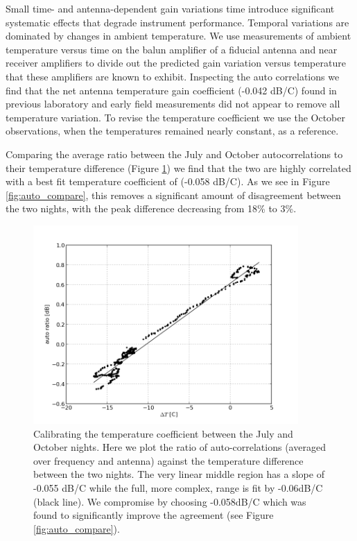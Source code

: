 \documentclass[preprint]{aastex}
\begin{document}
Small time- and antenna-dependent gain variations time introduce significant systematic effects that degrade 
instrument performance. Temporal variations are dominated by changes in ambient temperature. 
We use measurements of ambient temperature versus time on the balun amplifier of a fiducial antenna and near
receiver amplifiers to divide out the predicted gain variation versus temperature that these amplifiers
are known to exhibit.  Inspecting the auto correlations we find that the net antenna temperature gain coefficient (-0.042 dB/C) found in previous laboratory \citep{Parashare:2011p9872} and early field 
measurements  \citep{Pober:2012p8800} did not appear to remove all temperature variation.  To
revise the temperature coefficient we use the October observations, when the temperatures remained nearly constant, as a reference.


Comparing the average ratio between the July and October autocorrelations to their temperature difference (Figure \ref{fig:autos_tempcorr}) we find that the two are highly correlated  with 
a best fit temperature coefficient of (-0.058 dB/C). As we see in Figure \ref{fig:auto_compare}, this removes a significant amount of disagreement between the two nights, 
with the peak difference decreasing from 18\% to 3\%.


\begin{figure}
\includegraphics[width=0.9\textwidth]{plots/auto_tempcorr.png}
\caption{Calibrating the temperature coefficient  between the July and October nights.  Here we plot the ratio of auto-correlations (averaged over frequency and antenna) against the temperature difference between the two nights. The very linear middle region has a slope of  -0.055 dB/C while the full, more complex, range is fit by -0.06dB/C (black line).  We compromise by choosing -0.058dB/C   
which was found to significantly improve the agreement (see Figure \ref{fig:auto_compare}).
\label{fig:autos_tempcorr}}
\end{figure}
\end{document}
